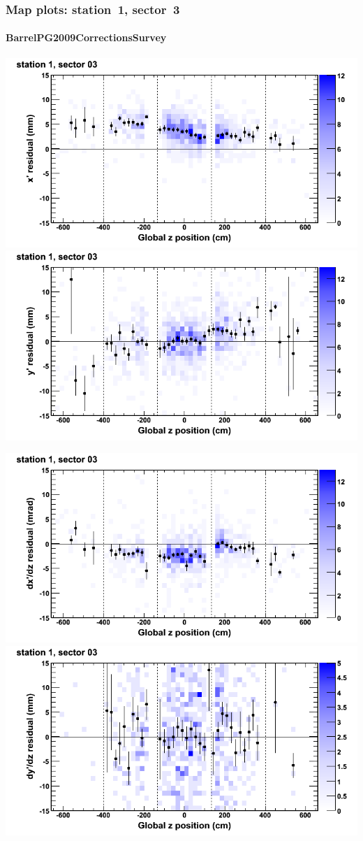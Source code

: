 \documentclass[compress]{beamer}
\begin{document}
\begin{frame}
\frametitle{Map plots: station~1, sector~3}
\framesubtitle{BarrelPG2009CorrectionsSurvey}
\includegraphics[width=0.5\linewidth]{mapplots_01/DTvsz_st1sec03_x.png}
\includegraphics[width=0.5\linewidth]{mapplots_01/DTvsz_st1sec03_y.png}

\includegraphics[width=0.5\linewidth]{mapplots_01/DTvsz_st1sec03_dxdz.png}
\includegraphics[width=0.5\linewidth]{mapplots_01/DTvsz_st1sec03_dydz.png}
\end{frame}
\end{document}

